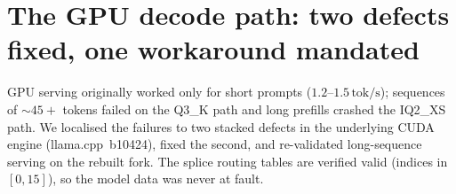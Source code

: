 \documentclass[11pt]{article}
\newcommand{\tps}{\,\textrm{tok/s}}
\begin{document}
\section{The GPU decode path: two defects fixed, one workaround mandated}
\label{sec:gpudefects}

GPU serving originally worked only for short prompts ($1.2$--$1.5\tps{}$);
sequences of ${\sim}45{+}$ tokens failed on the Q3\_K path and long prefills
crashed the IQ2\_XS path. We localised the failures to two stacked defects in
the underlying CUDA engine (llama.cpp~b10424), fixed the second, and
re-validated long-sequence serving on the rebuilt fork. The splice routing
tables are verified valid (indices in $[0,15]$), so the model data was never at
fault.
\end{document}
